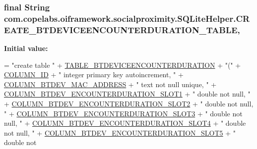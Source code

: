 \subsubsection[{C\+R\+E\+A\+T\+E\+\_\+\+B\+T\+D\+E\+V\+I\+C\+E\+E\+N\+C\+O\+U\+N\+T\+E\+R\+D\+U\+R\+A\+T\+I\+O\+N\+\_\+\+T\+A\+B\+L\+E}]{\setlength{\rightskip}{0pt plus 5cm}final String com.\+copelabs.\+oiframework.\+socialproximity.\+S\+Q\+Lite\+Helper.\+C\+R\+E\+A\+T\+E\+\_\+\+B\+T\+D\+E\+V\+I\+C\+E\+E\+N\+C\+O\+U\+N\+T\+E\+R\+D\+U\+R\+A\+T\+I\+O\+N\+\_\+\+T\+A\+B\+L\+E\hspace{0.3cm}{\ttfamily [static]}, {\ttfamily [private]}}\label{classcom_1_1copelabs_1_1oiframework_1_1socialproximity_1_1_s_q_lite_helper_ae34d36729919fc443f01068723578fa2}
{\bfseries Initial value\+:}
\begin{DoxyCode}
= \textcolor{stringliteral}{"create table "}
              + \hyperlink{classcom_1_1copelabs_1_1oiframework_1_1socialproximity_1_1_s_q_lite_helper_ab31b56a0eac0e440f57ad05a777f42be}{TABLE\_BTDEVICEENCOUNTERDURATION} + \textcolor{stringliteral}{"("}
              + \hyperlink{classcom_1_1copelabs_1_1oiframework_1_1socialproximity_1_1_s_q_lite_helper_a42da605a2e3ade18adf5dd701eb48b06}{COLUMN\_ID} + \textcolor{stringliteral}{" integer primary key autoincrement, "}
              + \hyperlink{classcom_1_1copelabs_1_1oiframework_1_1socialproximity_1_1_s_q_lite_helper_aa664c2d0219f93cc556b30e4b48954c1}{COLUMN\_BTDEV\_MAC\_ADDRESS} + \textcolor{stringliteral}{" text not null unique, "}
              + \hyperlink{classcom_1_1copelabs_1_1oiframework_1_1socialproximity_1_1_s_q_lite_helper_a4ef08ec127537c8cd3945d05ef9ebb5b}{COLUMN\_BTDEV\_ENCOUNTERDURATION\_SLOT1} + \textcolor{stringliteral}{" double not
       null, "}
              + \hyperlink{classcom_1_1copelabs_1_1oiframework_1_1socialproximity_1_1_s_q_lite_helper_a13ed1ee3d7a8645bbd511ccb9fa1e8e1}{COLUMN\_BTDEV\_ENCOUNTERDURATION\_SLOT2} + \textcolor{stringliteral}{" double not
       null, "}
              + \hyperlink{classcom_1_1copelabs_1_1oiframework_1_1socialproximity_1_1_s_q_lite_helper_a1581408605a4e12d35dd1e3977ac74a8}{COLUMN\_BTDEV\_ENCOUNTERDURATION\_SLOT3} + \textcolor{stringliteral}{" double not
       null, "}
              + \hyperlink{classcom_1_1copelabs_1_1oiframework_1_1socialproximity_1_1_s_q_lite_helper_a57d2e17fbe8da0029e9c2aec589ac2a9}{COLUMN\_BTDEV\_ENCOUNTERDURATION\_SLOT4} + \textcolor{stringliteral}{" double not
       null, "}
              + \hyperlink{classcom_1_1copelabs_1_1oiframework_1_1socialproximity_1_1_s_q_lite_helper_a0ec9e7d9918140c8438c33b336cf096a}{COLUMN\_BTDEV\_ENCOUNTERDURATION\_SLOT5} + \textcolor{stringliteral}{" double not
}
\end{DoxyCode}
